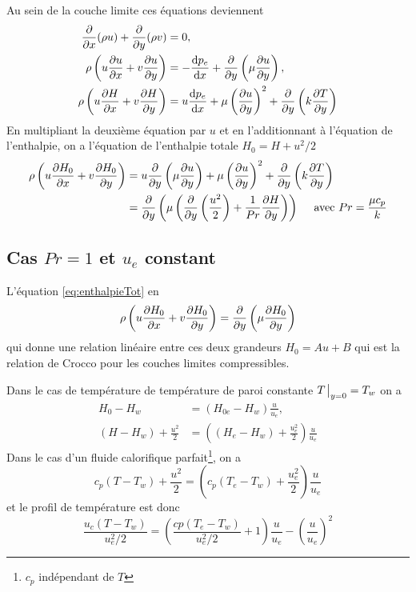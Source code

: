     Au sein de la couche limite ces équations deviennent
    \begin{equation}
      \begin{aligned}
        \pdv{x}(\rho u) + \pdv{y} (\rho v) &= 0,\\
        \rho \left(u \pdv{u}{x} + v\pdv{u}{y}\right) &= -\dv{p_e}{x} + \pdv{y}\left(\mu \pdv{u}{y}\right),\\
        \rho \left(u \pdv{H}{x} + v\pdv{H}{y}\right) &= u \dv{p_e}{x} + \mu \left(\pdv{u}{y}\right)^2 + \pdv{y} \left(k \pdv{T}{y}\right)
      \end{aligned}
    \end{equation}
    En multipliant la deuxième équation par $u$ et en l'additionnant à l'équation de l'enthalpie, on a l'équation de l'enthalpie totale $H_0 = H + u^2/2$
    \begin{equation}\label{eq:enthalpieTot}
      \begin{aligned}
        \rho \left(u \pdv{H_0}{x} + v \pdv{H_0}{y}\right) &= u \pdv{y}\left(\mu \pdv{u}{y}\right) + \mu \left(\pdv{u}{y}\right)^2 + \pdv{y} \left(k \pdv{T}{y}\right)\\
        &= \pdv{y} \left(\mu \left(\pdv{y}\left(\frac{u^2}{2}\right) + \frac{1}{Pr} \pdv{H}{y}\right)\right) \quad \textrm{ avec } Pr = \frac{\mu c_p}{k}
      \end{aligned}
    \end{equation}

    \subsection{Cas $Pr = 1$ et $u_e$ constant}
      L'équation \ref{eq:enthalpieTot} en
      \begin{equation}
        \rho \left(u\pdv{H_0}{x} + v \pdv{H_0}{y}\right) = \pdv{y} \left(\mu \pdv{H_0}{y}\right)
      \end{equation}
      qui donne une relation linéaire entre ces deux grandeurs $H_0 = Au+B$ qui est la relation de Crocco pour les couches limites compressibles.

      Dans le cas de température de température de paroi constante $T\eval_{y=0} = T_w$ on a
      \begin{equation}
        \begin{aligned}
          H_0 - H_w &= (H_{0e} - H_w)\frac{u}{u_e},\\
          (H - H_w) + \frac{u^2}{2} &= \left((H_e - H_w) + \frac{u_e^2}{2}\right) \frac{u}{u_e}
        \end{aligned}
      \end{equation}
      Dans le cas d'un fluide calorifique parfait\footnote{$c_p$ indépendant de $T$}, on a
      \begin{equation}
        c_p (T-T_w) + \frac{u^2}{2} = \left(c_p (T_e - T_w) + \frac{u_e^2}{2}\right)\frac{u}{u_e}
      \end{equation}
      et le profil de température est donc
      \begin{equation}
        \frac{u_c (T-T_w)}{u_e^2/2} = \left(\frac{cp (T_e - T_w)}{u_e^2/2} + 1\right) \frac{u}{u_e} - \left(\frac{u}{u_e}\right)^2
      \end{equation}

